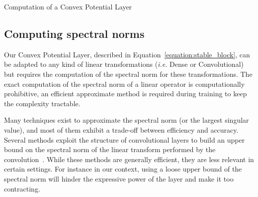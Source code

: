 \begin{algorithm}[tb]
\caption{Computation of a Convex Potential Layer}
\label{algorithm:stable_block}
\begin{algorithmic}
\end{algorithmic}
\end{algorithm}




\subsection{Computing spectral norms}
Our Convex Potential Layer, described in Equation~\ref{equation:stable_block}, can be adapted to any kind of linear transformations (\emph{i.e.} Dense or Convolutional) but requires the computation of the spectral norm for these transformations.
The exact computation of the spectral norm of a linear operator is computationally prohibitive, an efficient approximate method is required during training to keep the complexity tractable. 


Many techniques exist to approximate the spectral norm (or the largest singular value), and most of them exhibit a trade-off between efficiency and accuracy.
Several methods exploit the structure of convolutional layers to build an upper bound on the spectral norm of the linear transform performed by the convolution~\citep{jia2017improving,singla2021fantastic,araujo2021lipschitz}.
While these methods are generally efficient, they are less relevant  in certain settings. For instance in our context, using a loose upper bound of the spectral norm will hinder the expressive power of the layer and make it too contracting.

